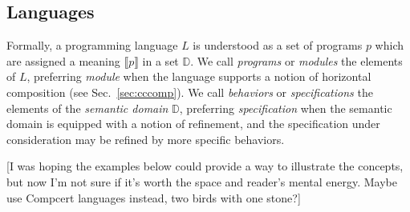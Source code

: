 \documentclass[sigplan,10pt,review,anonymous]{acmart}
\begin{document}
\subsection{Languages} %

Formally,
a programming language $L$ is understood as
a set of programs $p$
which are assigned a meaning $\llbracket p \rrbracket$
in a set $\mathbb{D}$.
We call \emph{programs} or \emph{modules} the elements of $L$,
preferring \emph{module} when
the language supports
a notion of horizontal composition (see Sec.~\ref{sec:cccomp}).
We call \emph{behaviors} or \emph{specifications}
the elements of the \emph{semantic domain} $\mathbb{D}$,
preferring \emph{specification} when
the semantic domain is equipped with
a notion of refinement,
and the specification under consideration
may be refined by more specific behaviors.

[I was hoping the examples below could provide a way to illustrate
the concepts,
but now I'm not sure if it's worth the space
and reader's mental energy.
Maybe use Compcert languages instead,
two birds with one stone?]
\end{document}
